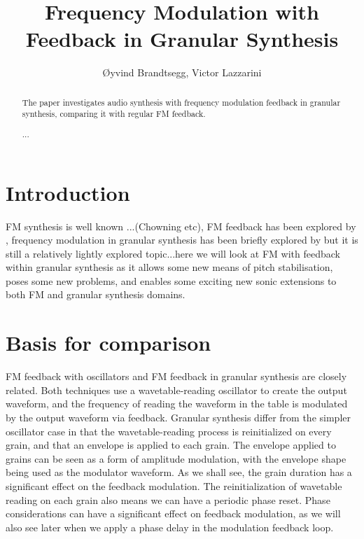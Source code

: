 \documentclass[runningheads,a4paper]{llncs}
\newcommand{\keywords}[1]{\par\addvspace\baselineskip
\noindent\keywordname\enspace\ignorespaces#1}
\begin{document}
\mainmatter  %

\title{Frequency Modulation with Feedback in Granular Synthesis}




\author{Øyvind Brandtsegg, Victor Lazzarini}
%




\maketitle

\begin{abstract}

The paper investigates audio synthesis with frequency modulation feedback in granular synthesis, comparing it with regular FM feedback. 

\keywords{...}
\end{abstract}


\section{Introduction}
FM synthesis is well known ...(Chowning etc), FM feedback has been explored by \cite{Lazzarini-2024}, frequency modulation in granular synthesis has been briefly explored by \cite{Ervik-Brandtsegg} but it is still a relatively lightly explored topic...here we will look at FM with feedback within granular synthesis as it allows some new means of pitch stabilisation, poses some new problems, and enables some exciting new sonic extensions to both FM and granular synthesis domains.

\section{Basis for comparison}
FM feedback with oscillators and FM feedback in granular synthesis are closely related. Both techniques use a wavetable-reading oscillator to create the output waveform, and the frequency of reading the waveform in the table is modulated by the output waveform via feedback. Granular synthesis differ from the simpler oscillator case in that the wavetable-reading process is reinitialized on every grain, and that an envelope is applied to each grain. The envelope applied to grains can be seen as a form of amplitude modulation, with the envelope shape being used as the modulator waveform. As we shall see, the grain duration has a significant effect on the feedback modulation. The reinitialization of wavetable reading on each grain also means we can have a periodic phase reset. Phase considerations can have a significant effect on feedback modulation, as we will also see later when we apply a phase delay in the modulation feedback loop.
\end{document}

